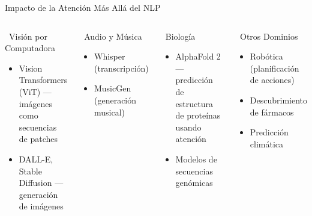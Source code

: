 \documentclass[aspectratio=169]{beamer}
\begin{document}
\begin{frame}{Impacto de la Atención Más Allá del NLP}
    \begin{columns}[t]
        \begin{block}{\faEye\ Visión por Computadora}
            \begin{itemize}
                \item Vision Transformers (ViT) --- imágenes como secuencias de patches
                \item DALL-E, Stable Diffusion --- generación de imágenes
            \end{itemize}
        \end{block}
        
        \begin{block}{\faMusic\ Audio y Música}
            \begin{itemize}
                \item Whisper (transcripción)
                \item MusicGen (generación musical)
            \end{itemize}
        \end{block}
        
        \begin{block}{\faDna\ Biología}
            \begin{itemize}
                \item AlphaFold 2 --- predicción de estructura de proteínas usando atención
                \item Modelos de secuencias genómicas
            \end{itemize}
        \end{block}
        
        \begin{block}{\faGamepad\ Otros Dominios}
            \begin{itemize}
                \item Robótica (planificación de acciones)
                \item Descubrimiento de fármacos
                \item Predicción climática
            \end{itemize}
        \end{block}
    \end{columns}
\end{frame}
\end{document}
